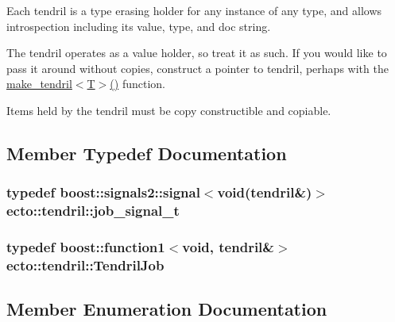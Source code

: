 Each tendril is a type erasing holder for any instance of any type, and allows introspection including its value, type, and doc string.

The tendril operates as a value holder, so treat it as such. If you would like to pass it around without copies, construct a pointer to tendril, perhaps with the \hyperlink{classecto_1_1tendril_adb5f2d5bf635a25473997e793f29a5a7}{make\+\_\+tendril$<$\+T$>$()} function.

Items held by the tendril must be copy constructible and copiable. 

\subsection{Member Typedef Documentation}
\subsubsection[{\texorpdfstring{job\+\_\+signal\+\_\+t}{job_signal_t}}]{\setlength{\rightskip}{0pt plus 5cm}typedef boost\+::signals2\+::signal$<$void({\bf tendril}\&)$>$ {\bf ecto\+::tendril\+::job\+\_\+signal\+\_\+t}\hspace{0.3cm}{\ttfamily [private]}}\hypertarget{classecto_1_1tendril_a59a62b4ac15de3a6a63a515dace8c420}{}\label{classecto_1_1tendril_a59a62b4ac15de3a6a63a515dace8c420}
\subsubsection[{\texorpdfstring{Tendril\+Job}{TendrilJob}}]{\setlength{\rightskip}{0pt plus 5cm}typedef boost\+::function1$<$void, {\bf tendril}\&$>$ {\bf ecto\+::tendril\+::\+Tendril\+Job}}\hypertarget{classecto_1_1tendril_ad312bffc767516bd2340d02cd9e218ae}{}\label{classecto_1_1tendril_ad312bffc767516bd2340d02cd9e218ae}


\subsection{Member Enumeration Documentation}
